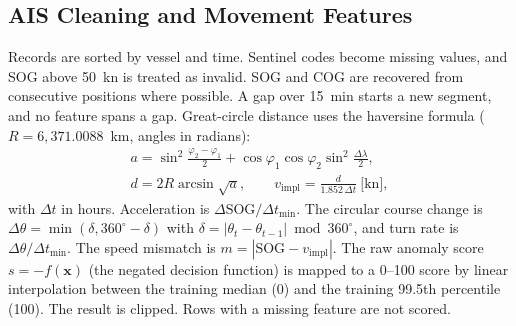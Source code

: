 \documentclass[conference]{IEEEtran}
\begin{document}
\subsection{AIS Cleaning and Movement Features}
Records are sorted by vessel and time. Sentinel codes become missing values, and SOG
above 50~kn is treated as invalid. SOG and COG are recovered from consecutive positions
where possible. A gap over 15~min starts a new segment, and no feature spans a gap.
Great-circle distance uses the haversine formula ($R=6{,}371.0088$~km, angles in radians):
\begin{gather}
a=\sin^2\!\tfrac{\varphi_2-\varphi_1}{2}+\cos\varphi_1\cos\varphi_2\sin^2\!\tfrac{\Delta\lambda}{2},\\
d=2R\arcsin\sqrt{a},\qquad v_{\mathrm{impl}}=\frac{d}{1.852\,\Delta t}\ \text{[kn]},
\end{gather}
with $\Delta t$ in hours. Acceleration is $\Delta\mathrm{SOG}/\Delta t_{\min}$. The circular
course change is $\Delta\theta=\min(\delta,360^\circ-\delta)$ with
$\delta=|\theta_t-\theta_{t-1}|\bmod 360^\circ$, and turn rate is
$\Delta\theta/\Delta t_{\min}$. The speed mismatch is $m=|\mathrm{SOG}-v_{\mathrm{impl}}|$.
The raw anomaly score $s=-f(\mathbf{x})$ (the negated decision function) is mapped to a
0--100 score by linear interpolation between the training median (0) and the training
99.5th percentile (100). The result is clipped. Rows with a missing feature are not
scored.
\end{document}
